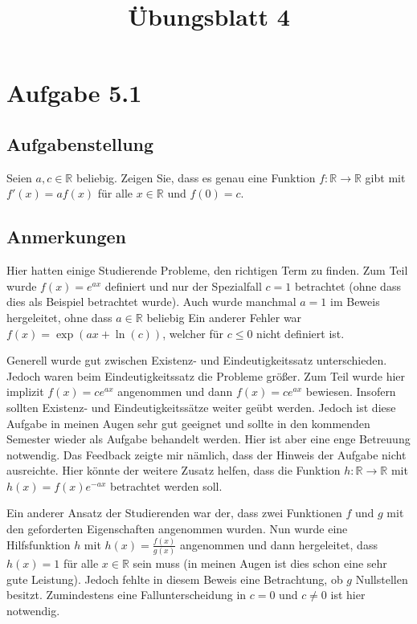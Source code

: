 \documentclass[a4paper]{article}
\title{Übungsblatt 4}
\date{}
\newcommand*{\R}{\mathbb R}
\begin{document}
\maketitle

\section{Aufgabe 5.1}

\subsection{Aufgabenstellung}

Seien $a,c\in\R$ beliebig. Zeigen Sie, dass es genau eine Funktion $f:\R\to\R$ gibt mit $f'(x)=af(x)$ für alle $x\in\R$ und $f(0)=c$.

\subsection{Anmerkungen}

Hier hatten einige Studierende Probleme, den richtigen Term zu finden. Zum Teil wurde $f(x)=e^{ax}$ definiert und nur der Spezialfall $c=1$ betrachtet (ohne dass dies als Beispiel betrachtet wurde). Auch wurde manchmal $a=1$ im Beweis hergeleitet, ohne dass $a\in\R$ beliebig Ein anderer Fehler war $f(x)=\exp(ax+\ln(c))$, welcher für $c \le 0$ nicht definiert ist.

Generell wurde gut zwischen Existenz- und Eindeutigkeitssatz unterschieden. Jedoch waren beim Eindeutigkeitssatz die Probleme größer. Zum Teil wurde hier implizit $f(x)=ce^{ax}$ angenommen und dann $f(x)=ce^{ax}$ bewiesen. Insofern sollten Existenz- und Eindeutigkeitssätze weiter geübt werden. Jedoch ist diese Aufgabe in meinen Augen sehr gut geeignet und sollte in den kommenden Semester wieder als Aufgabe behandelt werden. Hier ist aber eine enge Betreuung notwendig. Das Feedback zeigte mir nämlich, dass der Hinweis der Aufgabe nicht ausreichte. Hier könnte der weitere Zusatz helfen, dass die Funktion $h:\R\to\R$ mit $h(x)=f(x)e^{-ax}$ betrachtet werden soll.

Ein anderer Ansatz der Studierenden war der, dass zwei Funktionen $f$ und $g$ mit den geforderten Eigenschaften angenommen wurden. Nun wurde eine Hilfsfunktion $h$ mit $h(x)=\frac{f(x)}{g(x)}$ angenommen und dann hergeleitet, dass $h(x)=1$ für alle $x\in\R$ sein muss (in meinen Augen ist dies schon eine sehr gute Leistung). Jedoch fehlte in diesem Beweis eine Betrachtung, ob $g$ Nullstellen besitzt. Zumindestens eine Fallunterscheidung in $c=0$ und $c\neq 0$ ist hier notwendig.
\end{document}
